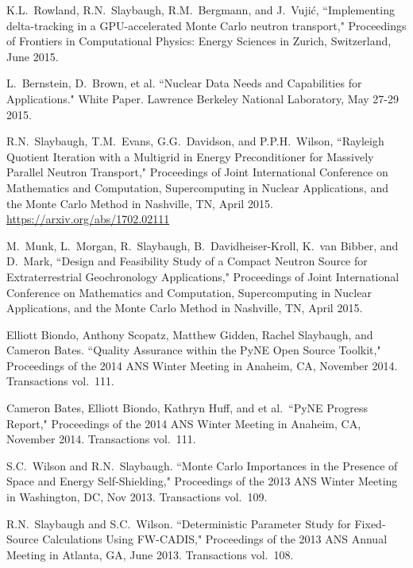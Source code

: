 \begin{bibsection}
\item K.L.\ Rowland, R.N.\ Slaybaugh, R.M.\ Bergmann, and J.\ Vuji\'c, ``Implementing delta-tracking in a GPU-accelerated Monte Carlo neutron transport," Proceedings of Frontiers in Computational Physics: Energy Sciences in Zurich, Switzerland, June 2015. 

\item L.\ Bernstein, D.\ Brown, et al. ``Nuclear Data Needs and Capabilities for Applications." White Paper. Lawrence Berkeley National Laboratory, May 27-29 2015. 

\item  R.N.\ Slaybaugh, T.M.\ Evans, G.G.\ Davidson, and P.P.H.\ Wilson, ``Rayleigh Quotient Iteration with a Multigrid in Energy Preconditioner for Massively Parallel Neutron Transport," Proceedings of Joint International Conference on Mathematics and Computation, Supercomputing in Nuclear Applications, and the Monte Carlo Method in Nashville, TN, April 2015.\\
\url{https://arxiv.org/abs/1702.02111}

\item  M.\ Munk, L.\ Morgan, R.\ Slaybaugh, B.\ Davidheiser-Kroll, K.\ van Bibber, and D.\ Mark, ``Design and Feasibility Study of a Compact Neutron Source for Extraterrestrial Geochronology Applications," Proceedings of Joint International Conference on Mathematics and Computation, Supercomputing in Nuclear Applications, and the Monte Carlo Method in Nashville, TN, April 2015.

\item Elliott Biondo, Anthony Scopatz, Matthew Gidden, Rachel Slaybaugh, and Cameron Bates. ``Quality Assurance within the PyNE Open Source Toolkit,"  Proceedings of the 2014 ANS Winter Meeting in Anaheim, CA, November 2014. Transactions vol.\ 111.

\item Cameron Bates, Elliott Biondo, Kathryn Huff, and et al.\ ``PyNE Progress Report," Proceedings of the 2014 ANS Winter Meeting in Anaheim, CA, November 2014. Transactions vol.\ 111.

\item S.C.\ Wilson and R.N.\ Slaybaugh. ``Monte Carlo Importances in the Presence of Space and Energy Self-Shielding," Proceedings of the 2013 ANS Winter Meeting in Washington, DC, Nov 2013. Transactions vol.\ 109.

\item R.N.\ Slaybaugh and  S.C.\ Wilson. ``Deterministic Parameter Study for Fixed-Source Calculations Using FW-CADIS," Proceedings of the 2013 ANS Annual Meeting in Atlanta, GA, June 2013. Transactions vol.\ 108.


\end{bibsection}
